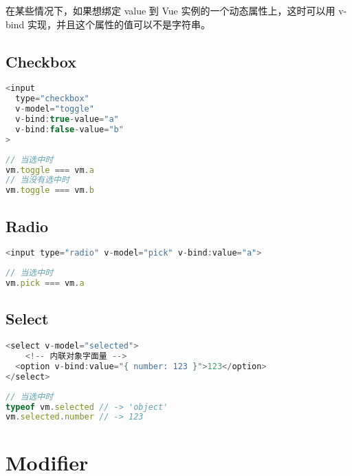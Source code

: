 在某些情况下，如果想绑定 value 到 Vue 实例的一个动态属性上，这时可以用 v-bind 实现，并且这个属性的值可以不是字符串。


\subsection{Checkbox}






\begin{lstlisting}[language=JavaScript]
<input
  type="checkbox"
  v-model="toggle"
  v-bind:true-value="a"
  v-bind:false-value="b"
>
\end{lstlisting}



\begin{lstlisting}[language=JavaScript]
// 当选中时
vm.toggle === vm.a
// 当没有选中时
vm.toggle === vm.b
\end{lstlisting}

\subsection{Radio}


\begin{lstlisting}[language=JavaScript]
<input type="radio" v-model="pick" v-bind:value="a">
\end{lstlisting}




\begin{lstlisting}[language=JavaScript]
// 当选中时
vm.pick === vm.a
\end{lstlisting}

\subsection{Select}


\begin{lstlisting}[language=JavaScript]
<select v-model="selected">
    <!-- 内联对象字面量 -->
  <option v-bind:value="{ number: 123 }">123</option>
</select>
\end{lstlisting}



\begin{lstlisting}[language=JavaScript]
// 当选中时
typeof vm.selected // -> 'object'
vm.selected.number // -> 123
\end{lstlisting}



\section{Modifier}


